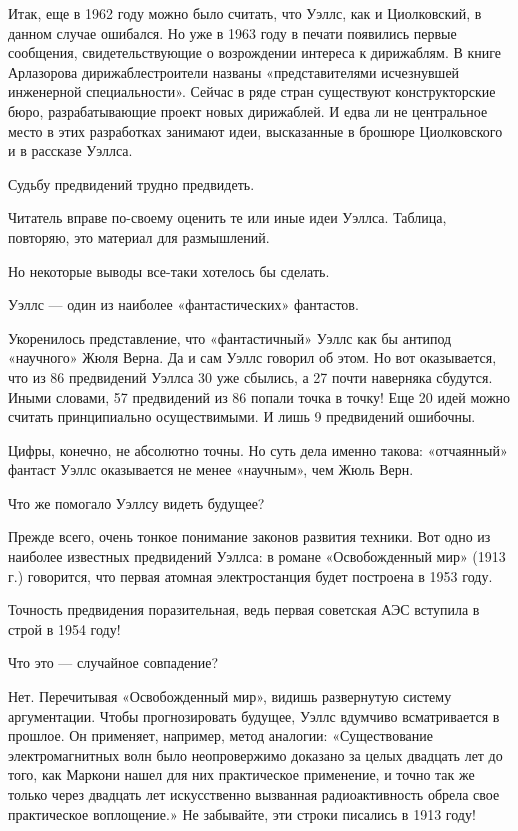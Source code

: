 Итак, еще в 1962 году можно было считать, что Уэллс, как и Циолковский,  в
данном случае  ошибался. Но  уже в  1963 году  в печати  появились  первые
сообщения, свидетельствующие о возрождении интереса к дирижаблям. В  книге
Арлазорова   дирижаблестроители   названы   «представителями   исчезнувшей
инженерной специальности». Сейчас в ряде стран существуют  конструкторские
бюро, разрабатывающие проект  новых дирижаблей. И  едва ли не  центральное
место в этих разработках занимают идеи, высказанные в брошюре Циолковского
и в рассказе Уэллса.

Судьбу предвидений трудно предвидеть.

Читатель вправе  по-своему  оценить  те или  иные  идеи  Уэллса.  Таблица,
повторяю, это материал для размышлений.

Но некоторые выводы все-таки хотелось бы сделать.

Уэллс — один из наиболее «фантастических» фантастов.

Укоренилось  представление,  что  «фантастичный»  Уэллс  как  бы   антипод
«научного» Жюля Верна. Да и сам Уэллс говорил об этом. Но вот оказывается,
что из  86  предвидений  Уэллса  30 уже  сбылись,  а  27  почти  наверняка
сбудутся. Иными словами, 57 предвидений из 86 попали точка в точку! Еще 20
идей можно  считать  принципиально  осуществимыми. И  лишь  9  предвидений
ошибочны.

Цифры,  конечно,  не  абсолютно  точны.   Но  суть  дела  именно   такова:
«отчаянный» фантаст Уэллс оказывается не менее «научным», чем Жюль Верн.

Что же помогало Уэллсу видеть будущее?

Прежде всего, очень тонкое понимание законов развития техники. Вот одно из
наиболее  известных  предвидений  Уэллса:  в  романе  «Освобожденный  мир»
(1913 г.) говорится, что первая  атомная электростанция будет построена  в
1953 году.

Точность предвидения поразительная, ведь  первая советская АЭС вступила  в
строй в 1954 году!

Что это — случайное совпадение?

Нет.  Перечитывая   «Освобожденный   мир»,  видишь   развернутую   систему
аргументации. Чтобы прогнозировать будущее, Уэллс вдумчиво всматривается в
прошлое.  Он   применяет,   например,   метод   аналогии:   «Существование
электромагнитных волн было неопровержимо доказано за целых двадцать лет до
того, как Маркони нашел  для них практическое применение,  и точно так  же
только через двадцать  лет искусственно  вызванная радиоактивность  обрела
свое практическое воплощение.»  Не забывайте, эти  строки писались в  1913
году!

